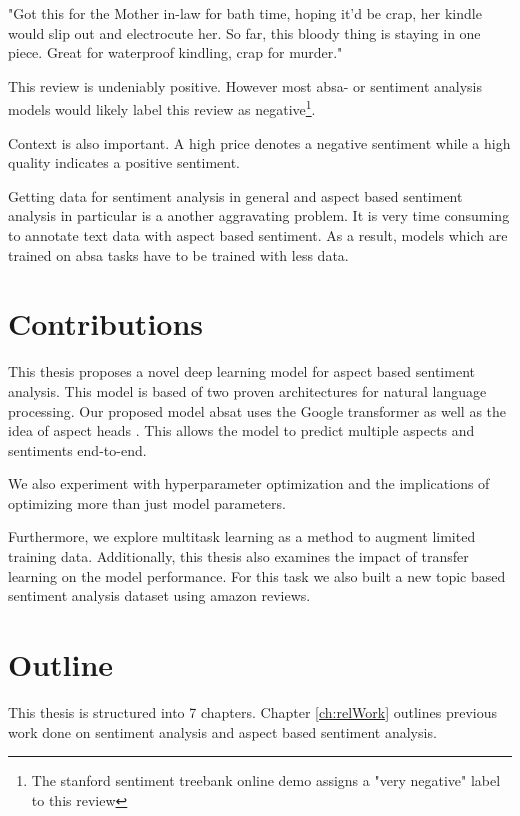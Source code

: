 \begin{center}
	"Got this for the Mother in-law for bath time, hoping it'd be crap, her kindle would slip out and electrocute her. So far, this bloody thing is staying in one piece. Great for waterproof kindling, crap for murder."
\end{center}

This review is undeniably positive. However most \gls{absa}- or sentiment analysis models would likely label this review as negative\footnote{The stanford sentiment treebank online demo assigns a "very negative" label to this review}.

Context is also important. A high price denotes a negative sentiment while a high quality indicates a positive sentiment.
\medskip

Getting data for sentiment analysis in general and aspect based sentiment analysis in particular is a another aggravating problem. It is very time consuming to annotate text data with aspect based sentiment. As a result, models which are trained on \gls{absa} tasks have to be trained with less data.

\section{Contributions}

This thesis proposes a novel deep learning model for aspect based sentiment analysis. This model is based of two proven architectures for natural language processing. Our proposed model \acrfull{absat} uses the Google transformer \cite{Vaswani2017d} as well as the idea of aspect heads \cite{Schmitt2018}. This allows the model to predict multiple aspects and sentiments end-to-end.
\medskip

We also experiment with hyperparameter optimization and the implications of optimizing more than just model parameters.

Furthermore, we explore multitask learning as a method to augment limited training data. Additionally, this thesis also examines the impact of transfer learning on the model performance. For this task we also built a new topic based sentiment analysis dataset using amazon reviews.

\section{Outline}

This thesis is structured into 7 chapters. Chapter \ref{ch:relWork} outlines previous work done on sentiment analysis and aspect based sentiment analysis.
\smallskip

